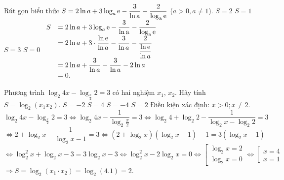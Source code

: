 \begin{ex}%
 Rút gọn biểu thức $S = 2\ln a + 3\log_a \rm{e} - \dfrac{3}{\ln a} - \dfrac{2}{\log_a \rm{e}}$ ($a>0, a \neq 1$).
 \choice
  {$S = 2$}
  {$S = 1$}
  {$S = 3$}
  {\True $S = 0$}
 \loigiai
  {
  \allowdisplaybreaks
  $\begin{array}{ll}
   S & = 2\ln a + 3\log_a \rm{e} - \dfrac{3}{\ln a} - \dfrac{2}{\log_a \rm{e}}\\
     & = 2\ln a + 3 \cdot \dfrac{\ln \rm{e}}{\ln a} - \dfrac{3}{\ln a} - \dfrac{2}{\dfrac{\ln \rm{e}}{\ln a}}\\
     & = 2 \ln a + \dfrac{3}{\ln a} - \dfrac{3}{\ln a} - 2 \ln a\\
     & = 0.
  \end{array}$
  }
\end{ex}


\begin{ex}%
 Phương trình $\log_2 4x - \log_{\frac{x}{2}} 2 = 3$ có hai nghiệm $x_1$, $x_2$. Hãy tính $S = \log_2(x_1x_2)$.
 \choice
  {$S = -2$}
  {$S = 4$}
  {$S = -4$}
  {\True $S = 2$}
 \loigiai
  {
  Điều kiện xác định: $x > 0; x \neq 2$.\\
  $\log_2 4x - \log_{\frac{x}{2}} 2 = 3 \Leftrightarrow \log_{2}4x-\dfrac{1}{\log_{2}\frac{x}{2}}=3\Leftrightarrow \log_{2}4+\log_{2}2-\dfrac{1}{\log_{2}x-\log_{2}2}=3$\\
  $\Leftrightarrow 2+\log_{2}x-\dfrac{1}{\log_{2}x-1}=3\Leftrightarrow \left(2+\log_{2}x\right)\left(\log_{2}x-1\right)-1=3\left(\log_{2}x-1\right)$\\
  $\Leftrightarrow \log_{2}^{2}x+\log_{2}x-3=3\log_{2}x-3\Leftrightarrow \log_{2}^{2}x-2\log_{2}x=0\Leftrightarrow \left[\begin{array}{l}\log_{2}x=2\\\log_{2}x=0\end{array}\right.\Leftrightarrow\left[\begin{array}{l}x=4\\x=1\end{array}\right.$\\
  $\Rightarrow S=\log_{2}(x_1\cdot x_2)=\log_{2}(4.1)=2$.
  }
\end{ex}


